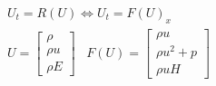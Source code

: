 \documentclass[10pt]{article} %
\begin{document}
\color{fgC}\[\begin{matrix}
 U_t = R(U)  \Leftrightarrow U_t = F(U)_x \\ 
 U = \begin{bmatrix}
 \rho \\ 
 \rho u \\
 \rho E
 \end{bmatrix}\;\;\;
 F(U) = \begin{bmatrix}
 \rho u \\ 
 \rho u^2 + p \\
 \rho u H
 \end{bmatrix} 
 \end{matrix}\]
\end{document}
